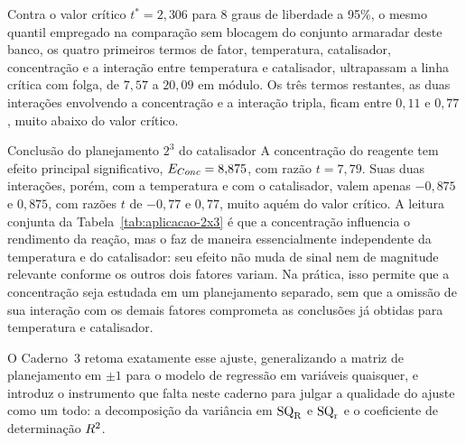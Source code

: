 \documentclass{doeapostila}
\begin{document}
Contra o valor crítico $t^{*} = 2{,}306$ para $8$ graus de liberdade a 95\%,
o mesmo quantil empregado na comparação sem blocagem do conjunto armaradar
deste banco, os quatro primeiros termos de fator, temperatura, catalisador,
concentração e a interação entre temperatura e catalisador, ultrapassam a
linha crítica com folga, de $7{,}57$ a $20{,}09$ em módulo. Os três termos
restantes, as duas interações envolvendo a concentração e a interação
tripla, ficam entre $0{,}11$ e $0{,}77$, muito abaixo do valor crítico.

\begin{aplicacao}{Conclusão do planejamento $2^{3}$ do catalisador}
  A concentração do reagente tem efeito principal significativo,
  $E_{Conc} = 8{,}875$, com razão $t = 7{,}79$. Suas duas interações,
  porém, com a temperatura e com o catalisador, valem apenas
  $-0{,}875$ e $0{,}875$, com razões $t$ de $-0{,}77$ e $0{,}77$, muito
  aquém do valor crítico. A leitura conjunta da Tabela~\ref{tab:aplicacao-2x3}
  é que a concentração influencia o rendimento da reação, mas o faz de
  maneira essencialmente independente da temperatura e do catalisador: seu
  efeito não muda de sinal nem de magnitude relevante conforme os outros
  dois fatores variam. Na prática, isso permite que a concentração seja
  estudada em um planejamento separado, sem que a omissão de sua interação
  com os demais fatores comprometa as conclusões já obtidas para temperatura
  e catalisador.
\end{aplicacao}

O Caderno~3 retoma exatamente esse ajuste, generalizando a matriz de
planejamento em $\pm 1$ para o modelo de regressão em variáveis quaisquer, e
introduz o instrumento que falta neste caderno para julgar a qualidade do
ajuste como um todo: a decomposição da variância em $\mathrm{SQ}_{\mathrm{R}}$ e $\mathrm{SQ}_{\mathrm{r}}$ e o
coeficiente de determinação $R^{2}$.

\paginadireitos
\end{document}
